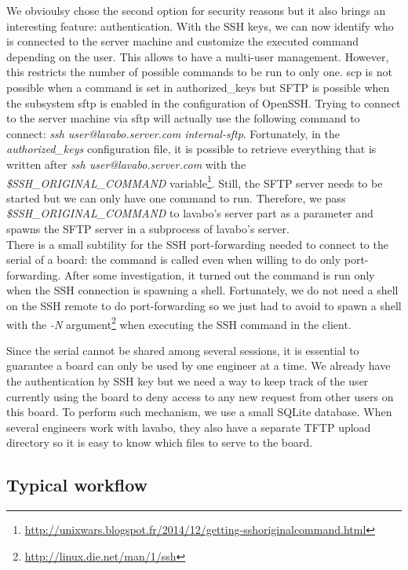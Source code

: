 We obvioulsy chose the second option for security reasons but it also brings an interesting feature: authentication. With the SSH keys, we can now identify who is connected to the server machine and customize the executed command depending on the user. This allows to have a multi-user management. However, this restricts the number of possible commands to be run to only one. scp is not possible when a command is set in authorized\_keys but SFTP is possible when the subsystem sftp is enabled in the configuration of OpenSSH. Trying to connect to the server machine via sftp will actually use the following command to connect: \textit{ssh user@lavabo.server.com internal-sftp}. Fortunately, in the \textit{authorized\_keys} configuration file, it is possible to retrieve everything that is written after \textit{ssh user@lavabo.server.com} with the \textit{\$SSH\_ORIGINAL\_COMMAND} variable\footnote{\url{http://unixwars.blogspot.fr/2014/12/getting-sshoriginalcommand.html}}. Still, the SFTP server needs to be started but we can only have one command to run. Therefore, we pass \textit{\$SSH\_ORIGINAL\_COMMAND} to lavabo's server part as a parameter and spawns the SFTP server in a subprocess of lavabo's server.\\
There is a small subtility for the SSH port-forwarding needed to connect to the serial of a board: the command is called even when willing to do only port-forwarding. After some investigation, it turned out the command is run only when the SSH connection is spawning a shell. Fortunately, we do not need a shell on the SSH remote to do port-forwarding so we just had to avoid to spawn a shell with the \textit{-N} argument\footnote{\url{http://linux.die.net/man/1/ssh}} when executing the SSH command in the client.

Since the serial cannot be shared among several sessions, it is essential to guarantee a board can only be used by one engineer at a time. We already have the authentication by SSH key but we need a way to keep track of the user currently using the board to deny access to any new request from other users on this board. To perform such mechanism, we use a small SQLite database. When several engineers work with lavabo, they also have a separate TFTP upload directory so it is easy to know which files to serve to the board.

\subsection{Typical workflow}

